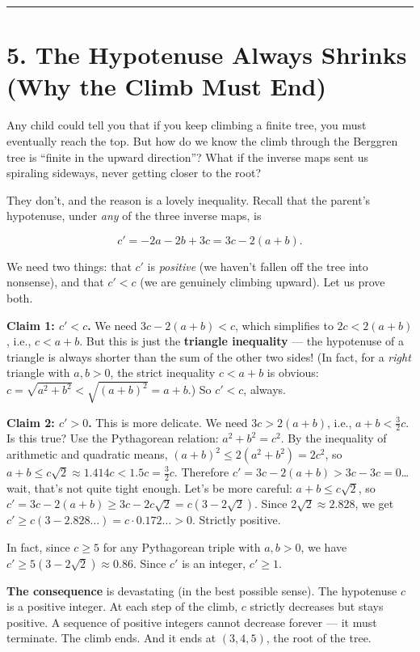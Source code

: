 \bigskip\noindent\rule{\linewidth}{0.4pt}\bigskip

\section{5. The Hypotenuse Always Shrinks (Why the Climb Must End)}
Any child could tell you that if you keep climbing a finite tree, you must eventually reach the top. But how do we know the climb through the Berggren tree is ``finite in the upward direction''? What if the inverse maps sent us spiraling sideways, never getting closer to the root?

They don't, and the reason is a lovely inequality. Recall that the parent's hypotenuse, under \emph{any} of the three inverse maps, is

\[c' = -2a - 2b + 3c = 3c - 2(a + b).\]

We need two things: that \(c'\) is \emph{positive} (we haven't fallen off the tree into nonsense), and that \(c' < c\) (we are genuinely climbing upward). Let us prove both.

\textbf{Claim 1: \(c' < c\).} We need \(3c - 2(a+b) < c\), which simplifies to \(2c < 2(a+b)\), i.e., \(c < a + b\). But this is just the \textbf{triangle inequality} --- the hypotenuse of a triangle is always shorter than the sum of the other two sides! (In fact, for a \emph{right} triangle with \(a, b > 0\), the strict inequality \(c < a + b\) is obvious: \(c = \sqrt{a^2 + b^2} < \sqrt{(a+b)^2} = a + b\).) So \(c' < c\), always.

\textbf{Claim 2: \(c' > 0\).} This is more delicate. We need \(3c > 2(a+b)\), i.e., \(a + b < \frac{3}{2}c\). Is this true? Use the Pythagorean relation: \(a^2 + b^2 = c^2\). By the inequality of arithmetic and quadratic means, \((a + b)^2 \leq 2(a^2 + b^2) = 2c^2\), so \(a + b \leq c\sqrt{2} \approx 1.414c < 1.5c = \frac{3}{2}c\). Therefore \(c' = 3c - 2(a+b) > 3c - 3c = 0\)\ldots{} wait, that's not quite tight enough. Let's be more careful: \(a + b \leq c\sqrt{2}\), so \(c' = 3c - 2(a+b) \geq 3c - 2c\sqrt{2} = c(3 - 2\sqrt{2})\). Since \(2\sqrt{2} \approx 2.828\), we get \(c' \geq c(3 - 2.828\ldots) = c \cdot 0.172\ldots > 0\). Strictly positive.

In fact, since \(c \geq 5\) for any Pythagorean triple with \(a, b > 0\), we have \(c' \geq 5(3 - 2\sqrt{2}) \approx 0.86\). Since \(c'\) is an integer, \(c' \geq 1\).

\textbf{The consequence} is devastating (in the best possible sense). The hypotenuse \(c\) is a positive integer. At each step of the climb, \(c\) strictly decreases but stays positive. A sequence of positive integers cannot decrease forever --- it must terminate. The climb ends. And it ends at \((3, 4, 5)\), the root of the tree.

